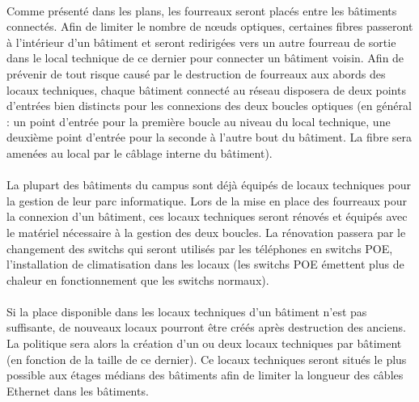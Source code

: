 \paragraph{} Comme présenté dans les plans, les fourreaux seront placés entre les bâtiments connectés. Afin de limiter le nombre de nœuds optiques, certaines fibres passeront à l'intérieur d'un bâtiment et seront redirigées vers un autre fourreau de sortie dans le local technique de ce dernier pour connecter un bâtiment voisin. Afin de prévenir de tout risque causé par le destruction de fourreaux aux abords des locaux techniques, chaque bâtiment connecté au réseau disposera de deux points d'entrées bien distincts pour les connexions des deux boucles optiques (en général : un point d'entrée pour la première boucle au niveau du local technique, une deuxième point d'entrée pour la seconde à l'autre bout du bâtiment. La fibre sera amenées au local par le câblage interne du bâtiment).

\paragraph{} La plupart des bâtiments du campus sont déjà équipés de locaux techniques pour la gestion de leur parc informatique. Lors de la mise en place des fourreaux pour la connexion d'un bâtiment, ces locaux techniques seront rénovés et équipés avec le matériel nécessaire à la gestion des deux boucles. La rénovation passera par le changement des switchs qui seront utilisés par les téléphones en switchs POE, l'installation de climatisation dans les locaux (les switchs POE émettent plus de chaleur en fonctionnement que les switchs normaux).

\paragraph{} Si la place disponible dans les locaux techniques d'un bâtiment n'est pas suffisante, de nouveaux locaux pourront être créés après destruction des anciens. La politique sera alors la création d'un ou deux locaux techniques par bâtiment (en fonction de la taille de ce dernier). Ce locaux techniques seront situés le plus possible aux étages médians des bâtiments afin de limiter la longueur des câbles Ethernet dans les bâtiments. 